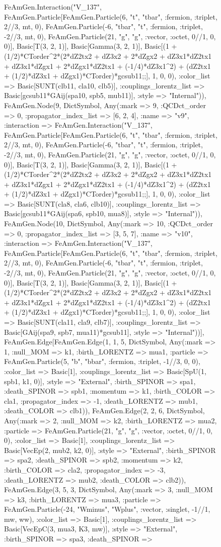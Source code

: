 \documentclass{revtex4}
\begin{document}
\begin{figure}[!htb]
\begin{center}
{FeAmGen.Interaction("V_137", FeAmGen.Particle[FeAmGen.Particle(6, "t", "tbar", :fermion, :triplet, 2//3, mt, 0), FeAmGen.Particle(-6, "tbar", "t", :fermion, :triplet, -2//3, mt, 0), FeAmGen.Particle(21, "g", "g", :vector, :octet, 0//1, 0, 0)], Basic[T(3, 2, 1)], Basic[Gamma(3, 2, 1)], Basic[(1 + (1/2)*CTorder^2*(2*dZ2tx2 + dZ3x2 + 2*dZgx2 + dZ3x1*dZ2tx1 + dZ3x1*dZgx1 + 2*dZgx1*dZ2tx1 + (-1/4)*dZ3x1^2) + (dZ2tx1 + (1/2)*dZ3x1 + dZgx1)*CTorder)*gcsub11;;], 1, 0, 0), :color_list => Basic[SUNT(clb11, cla10, clb5)], :couplings_lorentz_list => Basic[gcsub11*GAij(spa10, spb5, mub11)], :style => "Internal")), FeAmGen.Node(9, Dict{Symbol, Any}(:mark => 9, :QCDct_order => 0, :propagator_index_list => [6, 2, 4], :name => "v9", :interaction => FeAmGen.Interaction("V_137", FeAmGen.Particle[FeAmGen.Particle(6, "t", "tbar", :fermion, :triplet, 2//3, mt, 0), FeAmGen.Particle(-6, "tbar", "t", :fermion, :triplet, -2//3, mt, 0), FeAmGen.Particle(21, "g", "g", :vector, :octet, 0//1, 0, 0)], Basic[T(3, 2, 1)], Basic[Gamma(3, 2, 1)], Basic[(1 + (1/2)*CTorder^2*(2*dZ2tx2 + dZ3x2 + 2*dZgx2 + dZ3x1*dZ2tx1 + dZ3x1*dZgx1 + 2*dZgx1*dZ2tx1 + (-1/4)*dZ3x1^2) + (dZ2tx1 + (1/2)*dZ3x1 + dZgx1)*CTorder)*gcsub11;;], 1, 0, 0), :color_list => Basic[SUNT(cla8, cla6, clb10)], :couplings_lorentz_list => Basic[gcsub11*GAij(spa6, spb10, mua8)], :style => "Internal")), FeAmGen.Node(10, Dict{Symbol, Any}(:mark => 10, :QCDct_order => 0, :propagator_index_list => [3, 5, 7], :name => "v10", :interaction => FeAmGen.Interaction("V_137", FeAmGen.Particle[FeAmGen.Particle(6, "t", "tbar", :fermion, :triplet, 2//3, mt, 0), FeAmGen.Particle(-6, "tbar", "t", :fermion, :triplet, -2//3, mt, 0), FeAmGen.Particle(21, "g", "g", :vector, :octet, 0//1, 0, 0)], Basic[T(3, 2, 1)], Basic[Gamma(3, 2, 1)], Basic[(1 + (1/2)*CTorder^2*(2*dZ2tx2 + dZ3x2 + 2*dZgx2 + dZ3x1*dZ2tx1 + dZ3x1*dZgx1 + 2*dZgx1*dZ2tx1 + (-1/4)*dZ3x1^2) + (dZ2tx1 + (1/2)*dZ3x1 + dZgx1)*CTorder)*gcsub11;;], 1, 0, 0), :color_list => Basic[SUNT(cla11, cla9, clb7)], :couplings_lorentz_list => Basic[GAij(spa9, spb7, mua11)*gcsub11], :style => "Internal"))], FeAmGen.Edge[FeAmGen.Edge(1, 1, 5, Dict{Symbol, Any}(:mark => 1, :null_MOM => k1, :birth_LORENTZ => mua1, :particle => FeAmGen.Particle(5, "b", "bbar", :fermion, :triplet, -1//3, 0, 0), :color_list => Basic[1], :couplings_lorentz_list => Basic[SpU(1, spb1, k1, 0)], :style => "External", :birth_SPINOR => spa1, :death_SPINOR => spb1, :momentum => k1, :birth_COLOR => cla1, :propagator_index => -1, :death_LORENTZ => mub1, :death_COLOR => clb1)), FeAmGen.Edge(2, 2, 6, Dict{Symbol, Any}(:mark => 2, :null_MOM => k2, :birth_LORENTZ => mua2, :particle => FeAmGen.Particle(21, "g", "g", :vector, :octet, 0//1, 0, 0), :color_list => Basic[1], :couplings_lorentz_list => Basic[VecEp(2, mub2, k2, 0)], :style => "External", :birth_SPINOR => spa2, :death_SPINOR => spb2, :momentum => k2, :birth_COLOR => cla2, :propagator_index => -3, :death_LORENTZ => mub2, :death_COLOR => clb2)), FeAmGen.Edge(3, 5, 3, Dict{Symbol, Any}(:mark => 3, :null_MOM => k3, :birth_LORENTZ => mua3, :particle => FeAmGen.Particle(-24, "Wminus", "Wplus", :vector, :singlet, -1//1, mw, ww), :color_list => Basic[1], :couplings_lorentz_list => Basic[VecEpC(3, mua3, K3, mw)], :style => "External", :birth_SPINOR => spa3, :death_SPINOR => }
\end{center}
\end{figure}
\end{document}
